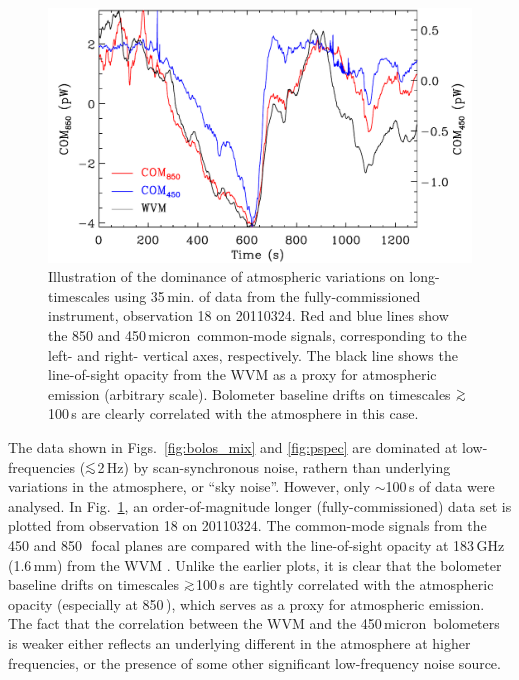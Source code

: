 \documentclass[useAMS,usenatbib,nofootinbib]{mn2e}
\def\lsim{\mathrel{\lower2.5pt\vbox{\lineskip=0pt\baselineskip=0pt
          \hbox{$<$}\hbox{$\sim$}}}}
\def\gsim{\mathrel{\lower2.5pt\vbox{\lineskip=0pt\baselineskip=0pt
          \hbox{$>$}\hbox{$\sim$}}}}
\begin{document}
\begin{figure}
\centering
\includegraphics[width=\linewidth]{skynoise}
\caption{Illustration of the dominance of atmospheric variations on
  long-timescales using 35\,min. of data from the fully-commissioned
  instrument, observation 18 on 20110324. Red and blue lines show the
  850 and 450\,micron\ common-mode signals, corresponding to the left-
  and right- vertical axes, respectively. The black line shows the
  line-of-sight opacity from the WVM as a proxy for atmospheric
  emission (arbitrary scale). Bolometer baseline drifts on timescales
  $\gsim$100\,s are clearly correlated with the atmosphere in this
  case.}
\label{fig:skynoise}
\end{figure}

The data shown in Figs.~\ref{fig:bolos_mix} and \ref{fig:pspec} are
dominated at low-frequencies ($\lsim$2\,Hz) by scan-synchronous noise,
rathern than underlying variations in the atmosphere, or ``sky
noise''. However, only $\sim$100\,s of data were analysed. In
Fig.~\ref{fig:skynoise}, an order-of-magnitude longer
(fully-commissioned) data set is plotted from observation 18 on
20110324. The common-mode signals from the 450 and 850\,\micron\ focal
planes are compared with the line-of-sight opacity at 183\,GHz
(1.6\,mm) from the WVM \citep[linear relationships between this
opacity, and those at 450 and 850\,micron\ are given
in][]{dempsey2012}. Unlike the earlier plots, it is clear that the
bolometer baseline drifts on timescales $\gsim$100\,s are tightly
correlated with the atmospheric opacity (especially at 850\,\micron),
which serves as a proxy for atmospheric emission. The fact that the
correlation between the WVM and the 450\,micron\ bolometers is weaker
either reflects an underlying different in the atmosphere at higher
frequencies, or the presence of some other significant low-frequency
noise source.
\end{document}
